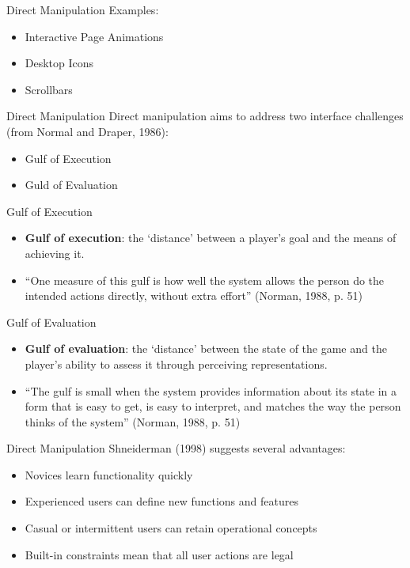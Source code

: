 \begin{frame}{Direct Manipulation}
	Examples:
	
	\begin{itemize}
		\item Interactive Page Animations
		\item Desktop Icons
		\item Scrollbars
	\end{itemize}
\end{frame}

\begin{frame}{Direct Manipulation}
	Direct manipulation aims to address two interface challenges (from Normal and Draper, 1986):
	
	\begin{itemize}
		\item Gulf of Execution
		\item Guld of Evaluation
	\end{itemize}
\end{frame}

\begin{frame}{Gulf of Execution}	
	\begin{itemize}
		\item \textbf{Gulf of execution}: the `distance' between a player's goal and the means of achieving it.
		\item ``One measure of this gulf is how well the system allows the person do the intended actions directly, without extra effort'' (Norman, 1988, p. 51)
	\end{itemize}
\end{frame}

\begin{frame}{Gulf of Evaluation}
	\begin{itemize}
		\item \textbf{Gulf of evaluation}: the `distance' between the state of the game and the player's ability to assess it through perceiving representations.
		\item ``The gulf is small when the system provides information about its state in a form that is easy to get, is easy to interpret, and matches the way the person thinks of the system'' (Norman, 1988, p. 51)
	\end{itemize}
\end{frame}

\begin{frame}{Direct Manipulation}
	Shneiderman (1998) suggests several advantages:
	
	\begin{itemize}
		\item Novices learn functionality quickly  \pause
		\item Experienced users can define new functions and features  \pause
		\item Casual or intermittent users can retain operational concepts  \pause
		\item Built-in constraints mean that all user actions are legal
	\end{itemize}
\end{frame}

